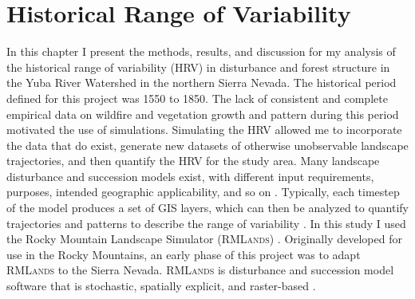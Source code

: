 
\chapter{Historical Range of Variability}
\label{ch:hrv}

In this chapter I present the methods, results, and discussion for my analysis of the historical range of variability (HRV) in disturbance and forest structure in the Yuba River Watershed in the northern Sierra Nevada. The historical period defined for this project was 1550 to 1850. The lack of consistent and complete empirical data on wildfire and vegetation growth and pattern during this period motivated the use of simulations. Simulating the HRV allowed me to incorporate the data that do exist, generate new datasets of otherwise unobservable landscape trajectories, and then quantify the HRV for the study area. Many landscape disturbance and succession models exist, with different input requirements, purposes, intended geographic applicability, and so on \citep{Keane2004}. Typically, each timestep of the model produces a set of GIS layers, which can then be analyzed to quantify trajectories and patterns to describe the range of variability \citep{Keane2004}. In this study I used the Rocky Mountain Landscape Simulator (\textsc{RMLands}) \citep{McGarigal2001}. Originally developed for use in the Rocky Mountains, an early phase of this project was to adapt \textsc{RMLands} to the Sierra Nevada. \textsc{RMLands} is disturbance and succession model software that is stochastic, spatially explicit, and raster-based \citep{Cushman2011}. 





